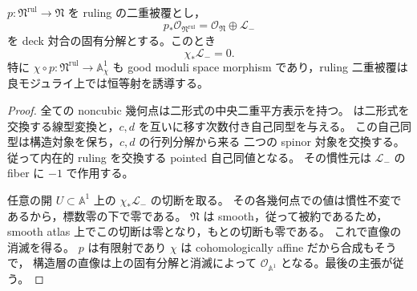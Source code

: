 \begin{lemma}
\label{lem:qa-noncubic-ruling-sign-pushforward-zero}
$p:\mathfrak N^{\mathrm{rul}}\to\mathfrak N$ を ruling の二重被覆とし，
\[
 p_*\mathcal O_{\mathfrak N^{\mathrm{rul}}}
       =\mathcal O_{\mathfrak N}\oplus\mathcal L_-
\]
を deck 対合の固有分解とする。このとき
\[
 \chi_*\mathcal L_-=0.
\]
特に $\chi\circ p:\mathfrak N^{\mathrm{rul}}\to\mathbb A^1_\chi$ も
good moduli space morphism であり，ruling 二重被覆は
良モジュライ上では恒等射を誘導する。
\end{lemma}
\begin{proof}
全ての noncubic 幾何点は二形式の中央二重平方表示を持つ。
\cite[\texttt{lem:noncubic-local-exchange}]{QuadricModuli2026}
は二形式を交換する線型変換と，$c,d$ を互いに移す次数付き自己同型を与える。
この自己同型は構造対象を保ち，$c,d$ の行列分解から来る
二つの spinor 対象を交換する。従って内在的 ruling を交換する
pointed 自己同値となる。
その慣性元は $\mathcal L_-$ の fiber に $-1$ で作用する。

任意の開 $U\subset\mathbb A^1$ 上の
$\chi_*\mathcal L_-$ の切断を取る。
その各幾何点での値は慣性不変であるから，標数零の下で零である。
$\mathfrak N$ は smooth，従って被約であるため，
smooth atlas 上でこの切断は零となり，もとの切断も零である。
これで直像の消滅を得る。
$p$ は有限射であり $\chi$ は cohomologically affine だから合成もそうで，
構造層の直像は上の固有分解と消滅によって
$\mathcal O_{\mathbb A^1}$ となる。最後の主張が従う。
\end{proof}

